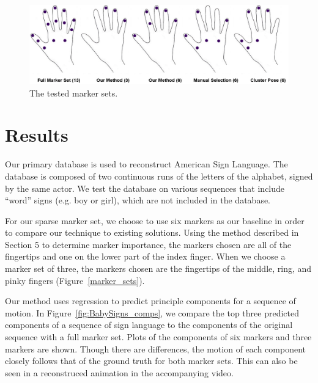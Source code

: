 
\begin{figure}[ht]
  \centering
  \includegraphics[width = 15cm] {images/marker_sets.jpg} %
  \caption{The tested marker sets.}
  \label{fig:marker_sets}
\end{figure}

\section{Results}
Our primary database is used to reconstruct American Sign Language. 
The database is composed of two continuous
runs of the letters of the 
alphabet, signed by the same actor. We test the database
on various sequences that include ``word'' signs (e.g. boy or girl),
which are not included in the database.




For our sparse marker set, we choose to use six markers as our
baseline in order to compare our technique to existing solutions. 
Using the method described in Section 5 to determine 
marker importance, the markers chosen are all of the fingertips
and one on the lower part of the index finger. When we choose a
marker set of three, the markers chosen are the fingertips of the 
middle, ring, and pinky fingers (Figure~\ref{marker_sets}).

Our method uses regression to predict principle components for
a sequence of motion. In Figure~\ref{fig:BabySigns_comps}, we compare
the top three predicted components of a sequence of sign language
to the components of the original sequence with a full marker set. Plots
of the components of six markers and three markers are shown.
Though there are differences, the motion of each component closely
follows that of the ground truth for both marker sets. This can also be seen
in a reconstruced animation in the accompanying video.


